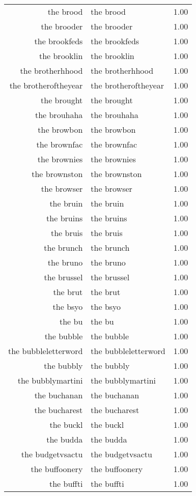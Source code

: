 \begin{table}[ht]
\begin{tabular}{rlr}
  the brood & the brood & 1.00 \\ 
  the brooder & the brooder & 1.00 \\ 
  the brookfeds & the brookfeds & 1.00 \\ 
  the brooklin & the brooklin & 1.00 \\ 
  the brotherhhood & the brotherhhood & 1.00 \\ 
  the brotheroftheyear & the brotheroftheyear & 1.00 \\ 
  the brought & the brought & 1.00 \\ 
  the brouhaha & the brouhaha & 1.00 \\ 
  the browbon & the browbon & 1.00 \\ 
  the brownfac & the brownfac & 1.00 \\ 
  the brownies & the brownies & 1.00 \\ 
  the brownston & the brownston & 1.00 \\ 
  the browser & the browser & 1.00 \\ 
  the bruin & the bruin & 1.00 \\ 
  the bruins & the bruins & 1.00 \\ 
  the bruis & the bruis & 1.00 \\ 
  the brunch & the brunch & 1.00 \\ 
  the bruno & the bruno & 1.00 \\ 
  the brussel & the brussel & 1.00 \\ 
  the brut & the brut & 1.00 \\ 
  the bsyo & the bsyo & 1.00 \\ 
  the bu & the bu & 1.00 \\ 
  the bubble & the bubble & 1.00 \\ 
  the bubbleletterword & the bubbleletterword & 1.00 \\ 
  the bubbly & the bubbly & 1.00 \\ 
  the bubblymartini & the bubblymartini & 1.00 \\ 
  the buchanan & the buchanan & 1.00 \\ 
  the bucharest & the bucharest & 1.00 \\ 
  the buckl & the buckl & 1.00 \\ 
  the budda & the budda & 1.00 \\ 
  the budgetvsactu & the budgetvsactu & 1.00 \\ 
  the buffoonery & the buffoonery & 1.00 \\ 
  the buffti & the buffti & 1.00 \\ 

\end{tabular}
\end{table}
